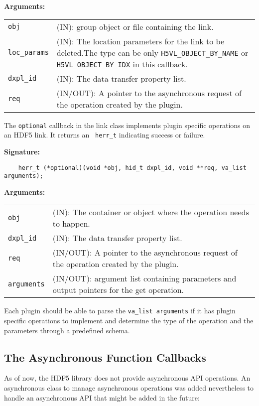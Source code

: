 \textbf{Arguments:}\\
\begin{tabular}{l p{10cm}}
  {\tt obj} & (IN): group object or file containing the link.\\
  {\tt loc\_params} & (IN): The location parameters for the link to be
  deleted.The type can be only {\tt H5VL\_OBJECT\_BY\_NAME} or {\tt
    H5VL\_OBJECT\_BY\_IDX} in this callback.\\ 
  {\tt dxpl\_id} & (IN): The data transfer property list.\\
  {\tt req} & (IN/OUT): A pointer to the asynchronous request of the
  operation created by the plugin.\\
\end{tabular}

The {\tt optional} callback in the link class implements plugin specific operations on an HDF5 link. It returns an {\tt
  herr\_t} indicating success or failure. 

\textbf{Signature:}
\begin{lstlisting}
    herr_t (*optional)(void *obj, hid_t dxpl_id, void **req, va_list arguments);
\end{lstlisting}

\textbf{Arguments:}\\
\begin{tabular}{l p{10cm}}
  {\tt obj} & (IN): The container or object where the operation needs to happen.\\
  {\tt dxpl\_id} & (IN): The data transfer property list.\\
  {\tt req} & (IN/OUT): A pointer to the asynchronous request of the operation created by the plugin.\\
  {\tt arguments} & (IN/OUT): argument list containing parameters and output pointers for the get operation. \\
\end{tabular}

Each plugin should be able to parse the {\tt va\_list arguments} if it has plugin specific operations to implement and determine the type of the operation and the parameters through a predefined schema. 

\subsection{The Asynchronous Function Callbacks}
As of now, the HDF5 library does not provide asynchronous API
operations. An asynchronous class to manage asynchronous operations
was added nevertheless to handle an asynchronous API that might be
added in the future:

